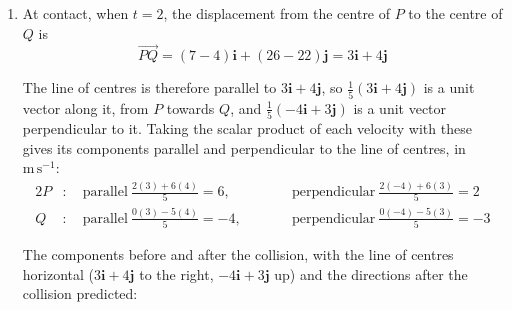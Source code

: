 \documentclass[leqno]{article}
\begin{document}
\begin{enumerate}[
  label=\textbf{\arabic*.},
  leftmargin=*,
  topsep=0pt,
  partopsep=0pt,
  parsep=0pt
]
\begin{djsSolution}
\begin{enumerate}[label=\textbf{(\alph*)}, start=1]
The equation has real solutions, so the spheres collide. Initially the centres are \(\sqrt{725}\,\mathrm{m}\) apart, more than \(5\,\mathrm{m}\), so the smaller solution gives the first contact, at
\[
t=2\,\mathrm{s}
\]

\item At contact, when \(t=2\), the displacement from the centre of \(P\) to the centre of \(Q\) is
\[
\overrightarrow{PQ}=(7-4)\mathbf{i}+(26-22)\mathbf{j}=3\mathbf{i}+4\mathbf{j}
\]

The line of centres is therefore parallel to \(3\mathbf{i}+4\mathbf{j}\), so \(\frac15(3\mathbf{i}+4\mathbf{j})\) is a unit vector along it, from \(P\) towards \(Q\), and \(\frac15(-4\mathbf{i}+3\mathbf{j})\) is a unit vector perpendicular to it. Taking the scalar product of each velocity with these gives its components parallel and perpendicular to the line of centres, in \(\mathrm{m\,s^{-1}}\):
\begin{alignat*}{2}
P&:\quad\text{parallel}\ \frac{2(3)+6(4)}{5}=6,&\qquad&\text{perpendicular}\ \frac{2(-4)+6(3)}{5}=2\\
Q&:\quad\text{parallel}\ \frac{0(3)-5(4)}{5}=-4,&&\text{perpendicular}\ \frac{0(-4)-5(3)}{5}=-3
\end{alignat*}

The components before and after the collision, with the line of centres horizontal (\(3\mathbf{i}+4\mathbf{j}\) to the right, \(-4\mathbf{i}+3\mathbf{j}\) up) and the directions after the collision predicted:\par\nopagebreak



\end{enumerate}
\end{djsSolution}
\end{enumerate}
\end{document}
